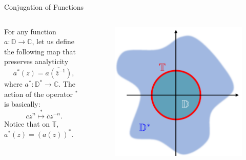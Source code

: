 \begin{frame}{Conjugation of Functions}
    \begin{columns}
    \begin{column}{0.5\textwidth}
        For any function $a:\mathbb{D}\rightarrow\mathbb{C}$, let us define the following map that preserves analyticity
        \begin{equation}
            a^*(z) = \overline{a(\overline{z}^{-1})},
        \end{equation}
        where $a^*:\mathbb{D}^*\rightarrow\mathbb{C}$. The action of the operator $^*$ is basically:
        \begin{equation}
            cz^n \stackrel{*}{\mapsto} \overline{c}z^{-n}.
        \end{equation}
        Notice that on $\mathbb{T}$, $a^*(z) = \left(a(z)\right)^*$.
    \end{column}
    \begin{column}{0.4\textwidth}
        \begin{figure}
            \centering
            \includegraphics[width=0.8\linewidth]{figures/complex_plane.png}
        \end{figure}
    \end{column}
    \end{columns}
\end{frame}
